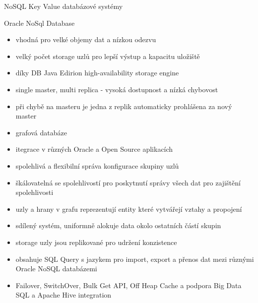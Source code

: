 \documentclass{article}
\begin{document}
\begin{section}{NoSQL Key Value databázové systémy}
		\begin{subsection}{Oracle NoSql Database}
			\begin{itemize}
				\item vhodná pro velké objemy dat a nízkou odezvu
				\item velký počet storage uzlů pro lepší výstup a kapacitu uložiště
				\item díky DB Java Edirion high-availability storage engine
				\item single master, multi replica - vysoká dostupnost a nízká chybovost
				\item při chybě na masteru je jedna z replik automaticky prohlášena za nový master
				\item grafová databáze
				\item itegrace v různých Oracle a Open Source aplikacích
				\item spolehlivá a flexibilní správa konfigurace skupiny uzlů
				\item škálovatelná se spolehlivostí pro poskytnutí správy všech dat pro zajištění spolehlivosti
				\item uzly a hrany v grafu reprezentují entity které vytvářejí vztahy a propojení
				\item sdílený systém, uniformně alokuje data okolo ostatních částí skupin
				\item storage uzly jsou replikované pro udržení konzistence
				\item obsahuje SQL Query s jazykem pro import, export a přenos dat mezi různými Oracle NoSQL databázemi
				\item Failover, SwitchOver, Bulk Get API, Off Heap Cache a podpora Big Data SQL a Apache Hive integration
			\end{itemize}
		\end{subsection}
		

\end{section}
\end{document}
